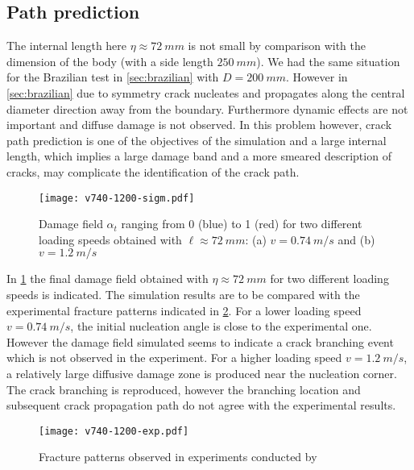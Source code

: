 \subsection{Path prediction}
The internal length here $\eta\approx \SI{72}{mm}$ is not small by comparison with the dimension of the body (with a side length $\SI{250}{mm}$). We had the same situation for the Brazilian test in \cref{sec:brazilian} with $D=\SI{200}{mm}$. However in \cref{sec:brazilian} due to symmetry crack nucleates and propagates along the central diameter direction away from the boundary. Furthermore dynamic effects are not important and diffuse damage is not observed. In this problem however, crack path prediction is one of the objectives of the simulation and a large internal length, which implies a large damage band and a more smeared description of cracks, may complicate the identification of the crack path.
\begin{figure}[htbp]
\centering
\texttt{[image: v740-1200-sigm.pdf]}
\caption{Damage field $\alpha_t$ ranging from 0 (blue) to 1 (red) for two different loading speeds obtained with $\ell\approx\SI{72}{mm}$: (a) $v=\SI{0.74}{m/s}$ and (b) $v=\SI{1.2}{m/s}$} \label{fig:v7401200sigm}
\end{figure}

In \cref{fig:v7401200sigm} the final damage field obtained with $\eta\approx\SI{72}{mm}$ for two different loading speeds is indicated. The simulation results are to be compared with the experimental fracture patterns indicated in \cref{fig:v7401200exp}. For a lower loading speed $v=\SI{0.74}{m/s}$, the initial nucleation angle is close to the experimental one. However the damage field simulated seems to indicate a crack branching event which is not observed in the experiment. For a higher loading speed $v=\SI{1.2}{m/s}$, a relatively large diffusive damage zone is produced near the nucleation corner. The crack branching is reproduced, however the branching location and subsequent crack propagation path do not agree with the experimental results.
\begin{figure}[htbp]
\centering
\texttt{[image: v740-1200-exp.pdf]}
\caption{Fracture patterns observed in experiments conducted by \cite{OzboltBedeSharmaMayer:2015}} \label{fig:v7401200exp}
\end{figure}

